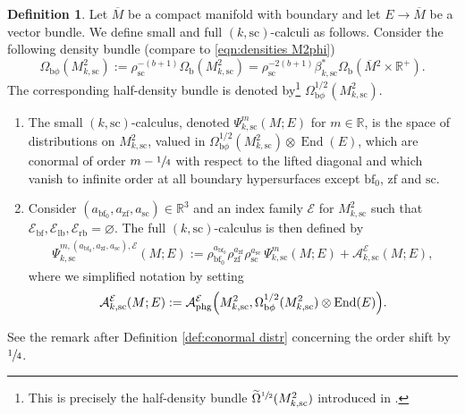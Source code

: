\documentclass[JEP,XML,SOM,Unicode,NoFloatCountersInSection,published]{cedram}
\newcommand{\bphi}{{\bb\phi}}
\theoremstyle{plain}
\theoremstyle{definition}
\newtheorem{defn}[Th]{Definition}
\newcommand{\R}{{\mathbb{R}}}
\newcommand\calA{{\mathcal A}}
\newcommand\calE{{\mathcal E}}
\newcommand {\phg}{{\mathrm{phg}}}
\newcommand{\lf}{{\mathrm{lb}}}
\newcommand{\rf}{{\mathrm{rb}}}
\newcommand{\bb}{{\mathrm{b}}}
\newcommand{\bbf}{{\mathrm{bf}}}
\newcommand{\bbfz}{{\bbf_0}}
\newcommand{\bfz}{{\bbf_0}}
\newcommand{\ssc}{{\mathrm{sc}}}
\newcommand{\zf}{{\mathrm{zf}}}
\DeclareMathOperator{\End}{End}
\newcommand{\Mbar}{{\overline{M}}}\let\M\Mbar
\begin{document}
\begin{defn}\label{def:ksc space}
Let $\Mbar$ be a compact manifold with boundary and let $E\to\Mbar$ be a vector bundle.
We define small and full $(k,\ssc)$-calculi as follows. Consider the
following density bundle (compare to \eqref{eqn:densities M2phi})
\begin{equation}
\Omega_{\bphi}(M^{2}_{k, \ssc}) := \rho_{\ssc}^{-(b+1)}
\Omega_\bb(M^{2}_{k, \ssc}) = \rho_{\ssc}^{-2(b+1)}
\beta_{k, \ssc}^* \Omega_\bb(\Mbar{}^2 \times \R^+).
\end{equation}
The corresponding half-density bundle is denoted by\footnote{This is precisely the
half-density bundle $\widetilde{\Omega}^{\sfrac{1}{2}}(M^{2}_{k, \ssc})$ introduced in
\cite[\S 2.2.2]{guillarmou2008resolvent}.} $\Omega^{1/2}_{\bphi}(M^{2}_{k, \ssc})$.
\begin{enumerate}
\item
The small $(k,\ssc)$-calculus, denoted $\Psi_{k,\ssc}^{m}(M;E)$ for $m\in\R$, is the space of distributions on $M^2_{k,\ssc}$, valued in $\Omega^{1/2}_{\bphi}(M^{2}_{k, \ssc}) \otimes \End(E)$,
which are conormal of order $m-\sfrac14$ with
respect to the lifted diagonal and which vanish to infinite order at all boundary hypersurfaces except $\bbfz$, $\zf$ and $\ssc$.

\item
Consider $(a_{\bfz},a_{\zf},a_{\ssc}) \in \mathbb{R}^{3}$ and an index family $\mathcal{E}$ for $M^{2}_{k, \ssc}$ such that
$\mathcal{E}_{\bbf},\mathcal{E}_{\lf}, \mathcal{E}_{\rf} = \varnothing$.
The full $(k,\ssc)$-calculus is then defined by
\begin{equation}
\label{GH-calculus}
\begin{split}
\Psi_{k,\ssc}^{m,(a_{\bfz},a_{\zf},a_{\ssc}),\calE}(M;E) :=
\rho_{\bbfz}^{a_\bbfz}\rho_\zf^{a_\zf}\rho_\ssc^{a_\ssc}\,\Psi_{k,\ssc}^{m}(M;E) + \calA_{k, \ssc}^\calE(M;E),
\end{split}
\end{equation}
where we simplified notation by setting
\begin{equation}
\begin{split}
\calA_{k, \ssc}^\calE(M;E):= \calA_{\phg}^\calE \Bigl(M^{2}_{k, \ssc},
\Omega^{1/2}_{\bphi} (M^{2}_{k, \ssc})
\otimes \End(E)\Bigr).
\end{split}
\end{equation}
\end{enumerate}
\end{defn}

See the remark after Definition \ref{def:conormal distr} concerning the order shift by $\sfrac14$.
\end{document}
